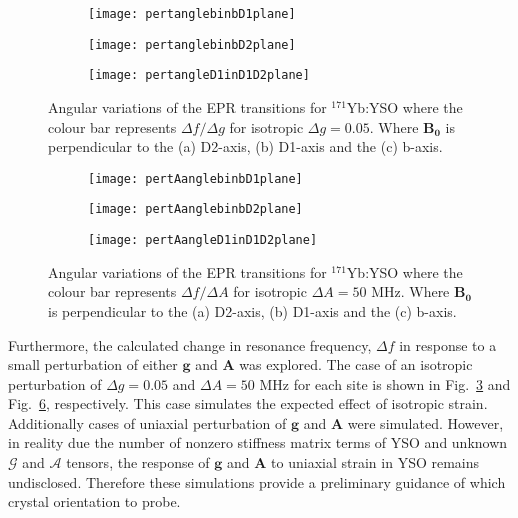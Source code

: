 \begin{figure}[H]
    \centering
    \begin{subfigure}[b]{0.45\textwidth}
        \centering
        \texttt{[image: pertanglebinbD1plane]}
        \caption{\label{fig:simmagresori1}}
    \end{subfigure}
    \begin{subfigure}[b]{0.45\textwidth}
        \centering
        \texttt{[image: pertanglebinbD2plane]}
   \caption{}
   \end{subfigure}
       \begin{subfigure}[b]{0.45\textwidth}
        \centering
        \texttt{[image: pertangleD1inD1D2plane]}
   \caption{\label{fig:simmagresori2}}
   \end{subfigure}
   \caption{Angular variations of the EPR transitions for $^{171}$Yb:YSO where the colour bar represents $\Delta f/\Delta g$ for isotropic $\Delta g = 0.05$. Where $\bm{B_{0}}$ is perpendicular to the (a) D2-axis, (b) D1-axis and the (c) b-axis.}
   \label{fig:dfdg}
\end{figure}


\begin{figure}[H]
    \centering
    \begin{subfigure}[b]{0.45\textwidth}
        \centering
        \texttt{[image: pertAanglebinbD1plane]}
        \caption{\label{fig:simmagresori1}}
    \end{subfigure}
    \begin{subfigure}[b]{0.45\textwidth}
        \centering
        \texttt{[image: pertAanglebinbD2plane]}
   \caption{}
   \end{subfigure}
       \begin{subfigure}[b]{0.45\textwidth}
        \centering
        \texttt{[image: pertAangleD1inD1D2plane]}
   \caption{\label{fig:simmagresori2}}
   \end{subfigure}
   \caption{Angular variations of the EPR transitions for $^{171}$Yb:YSO where the colour bar represents $\Delta f/\Delta A$ for isotropic $\Delta A = 50$ MHz. Where $\bm{B_{0}}$ is perpendicular to the (a) D2-axis, (b) D1-axis and the (c) b-axis.}
   \label{fig:dfdA}
\end{figure}

Furthermore, the calculated change in resonance frequency, $\Delta f$ in response to a small perturbation of either $\bm{g}$ and $\bm{A}$ was explored. The case of an isotropic perturbation of $\Delta g = 0.05$ and $\Delta A = 50$ MHz for each site is shown in Fig.~\ref{fig:dfdg} and Fig.~\ref{fig:dfdA}, respectively. This case simulates the expected effect of isotropic strain. Additionally cases of uniaxial perturbation of $\bm{g}$ and $\bm{A}$ were simulated. However, in reality due the number of nonzero stiffness matrix terms of YSO and unknown $\bm{\mathcal{G}}$ and $\bm{\mathcal{A}}$ tensors, the response of $\bm{g}$ and $\bm{A}$ to uniaxial strain in YSO remains undisclosed. Therefore these simulations provide a preliminary guidance of which crystal orientation to probe.





